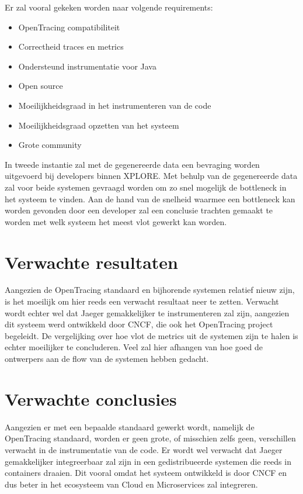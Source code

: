 Er zal vooral gekeken worden naar volgende requirements:
\begin{itemize}
	\item OpenTracing compatibiliteit
	\item Correctheid traces en metrics
	\item Ondersteund instrumentatie voor Java
	\item Open source
	\item Moeilijkheidsgraad in het instrumenteren van de code
	\item Moeilijkheidsgraad opzetten van het systeem
	\item Grote community
\end{itemize}

In tweede instantie zal met de gegenereerde data een bevraging worden uitgevoerd bij developers binnen XPLORE. Met behulp van de gegenereerde data zal voor beide systemen gevraagd worden om zo snel mogelijk de bottleneck in het systeem te vinden. Aan de hand van de snelheid waarmee een bottleneck kan worden gevonden door een developer zal een conclusie trachten gemaakt te worden met welk systeem het meest vlot gewerkt kan worden.

\section{Verwachte resultaten}
\label{sec:verwachte_resultaten}

Aangezien de OpenTracing standaard en bijhorende systemen relatief nieuw zijn, is het moeilijk om hier reeds een verwacht resultaat neer te zetten. Verwacht wordt echter wel dat Jaeger gemakkelijker te instrumenteren zal zijn, aangezien dit systeem werd ontwikkeld door CNCF, die ook het OpenTracing project begeleidt. De vergelijking over hoe vlot de metrics uit de systemen zijn te halen is echter moeilijker te concluderen. Veel zal hier afhangen van hoe goed de ontwerpers aan de flow van de systemen hebben gedacht.

\section{Verwachte conclusies}
\label{sec:verwachte_conclusies}

Aangezien er met een bepaalde standaard gewerkt wordt, namelijk de OpenTracing standaard, worden er geen grote, of misschien zelfs geen, verschillen verwacht in de instrumentatie van de code. Er wordt wel verwacht dat Jaeger gemakkelijker integreerbaar zal zijn in een gedistribueerde systemen die reeds in containers draaien. Dit vooral omdat het systeem ontwikkeld is door CNCF en dus beter in het ecosysteem van Cloud en Microservices zal integreren.

